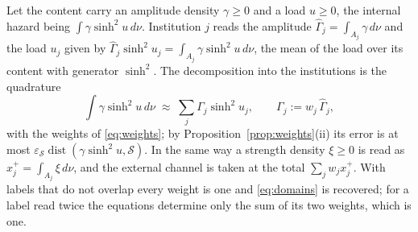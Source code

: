 \begin{definition}\label{def:quadrature}
Let the content carry an amplitude density $\gamma\ge0$ and a load
$u\ge0$, the internal hazard being $\int\gamma\sinh^2u\,d\nu$. Institution
$j$ reads the amplitude $\hat\Gamma_j=\int_{A_j}\gamma\,d\nu$ and the load
$u_j$ given by
$\hat\Gamma_j\sinh^2u_j=\int_{A_j}\gamma\sinh^2u\,d\nu$, the mean of the
load over its content with generator $\sinh^2$. The decomposition into
the institutions is the quadrature
\begin{equation}\label{eq:quadrature}
\int\gamma\sinh^2u\,d\nu\;\approx\;\sum_j\Gamma_j\sinh^2u_j,
\qquad\Gamma_j:=w_j\,\hat\Gamma_j,
\end{equation}
with the weights of \eqref{eq:weights}; by
Proposition~\ref{prop:weights}(ii) its error is at most
$\varepsilon_{\mathcal S}\operatorname{dist}(\gamma\sinh^2u,\mathcal S)$.
In the same way a strength density $\xi\ge0$ is read as
$x_j^+=\int_{A_j}\xi\,d\nu$, and the external channel is taken at the
total $\sum_jw_jx_j^+$. With labels that do not overlap every weight is
one and \eqref{eq:domains} is recovered; for a label read twice the
equations determine only the sum of its two weights, which is one.
\end{definition}

